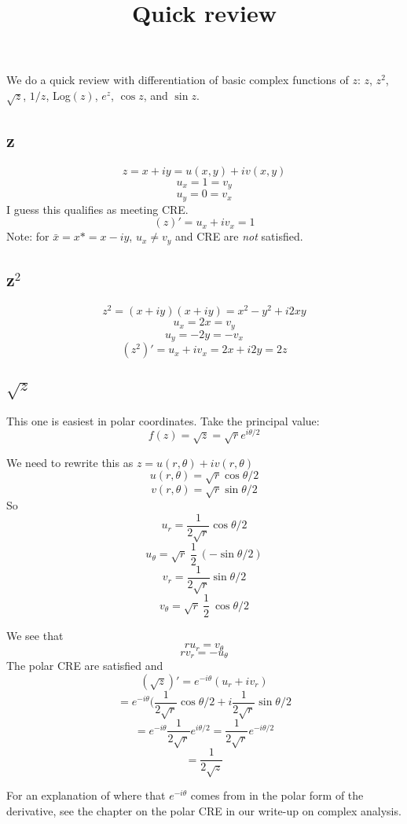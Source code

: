 \documentclass[11pt, oneside]{article}
\title{Quick review}
\date{}
\begin{document}
\maketitle
\Large
We do a quick review with differentiation of basic complex functions of $z$:  $z$, $z^2$, $\sqrt{z}$, $1/z$, Log$(z)$, $e^z$, $\cos z$, and $\sin z$.
\subsection*{z}
\[ z = x + iy = u(x,y) + iv(x,y) \]
\[ u_x = 1 = v_y \]
\[ u_y = 0 = v_x \]
I guess this qualifies as meeting CRE.
\[ (z)' = u_x + i v_x = 1 \]
Note:  for $\bar{x} = x* = x - iy$, $u_x \ne v_y$ and CRE are \emph{not} satisfied.

\subsection*{z$^2$}
\[ z^2 = (x + iy)(x + iy) = x^2 - y^2 + i2xy \]
\[ u_x = 2x = v_y \]
\[ u_y = -2y = - v_x \]
\[ (z^2)' = u_x + i v_x = 2x + i 2y = 2 z \]

\subsection*{$\sqrt{z}$}
This one is easiest in polar coordinates.  Take the principal value:
\[ f(z) = \sqrt{z} = \sqrt{r} e^{i \theta/2} \]

We need to rewrite this as $z = u(r,\theta) + i v(r, \theta)$
\[ u(r,\theta) = \sqrt{r} \cos \theta/2 \]
\[ v(r,\theta) = \sqrt{r} \sin \theta/2 \]
So
\[ u_r = \frac{1}{2 \sqrt{r}} \cos \theta/2 \]
\[ u_{\theta} = \sqrt{r} \ \frac{1}{2} \  (- \sin \theta/2) \]
\[ v_r = \frac{1}{2 \sqrt{r}} \sin \theta/2 \]
\[ v_{\theta} = \sqrt{r} \ \frac{1}{2} \  \cos \theta/2 \]

We see that
\[ r u_r = v_{\theta} \]
\[ r v_r = - u_{\theta} \]
The polar CRE are satisfied and
\[ (\sqrt{z})' = e^{-i\theta} (u_r + i v_r) \]
\[ = e^{-i\theta} (\frac{1}{2 \sqrt{r}} \cos \theta/2 + i \frac{1}{2 \sqrt{r}} \sin \theta/2 \]
\[ = e^{-i\theta} \frac{1}{2 \sqrt{r}} e^{i \theta/2} =  \frac{1}{2 \sqrt{r}} e^{- i \theta/2} \]
\[ = \frac{1}{2 \sqrt{z}} \]

For an explanation of where that $e^{-i\theta}$ comes from in the polar form of the derivative, see the chapter on the polar CRE in our write-up on complex analysis.
\end{document}
